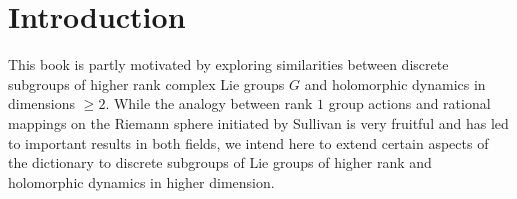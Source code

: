 \documentclass[12pt]{amsbook}%
\theoremstyle{definition}
\theoremstyle{remark}
\numberwithin{section}{chapter}
\numberwithin{subsection}{section}
\numberwithin{figure}{chapter}
\begin{document}

%
%
%
%
%
%
%




\chapter*{Introduction}

This book is partly motivated by exploring similarities between discrete subgroups of higher rank complex Lie groups $G$ and holomorphic dynamics in dimensions $\geqslant 2$.
While the analogy between rank $1$ group actions and rational mappings on the Riemann sphere initiated by Sullivan is very fruitful and has led to important results in both fields, we intend here to extend certain aspects of the dictionary to discrete subgroups of Lie groups of higher rank and holomorphic dynamics in higher dimension. 
\end{document}
